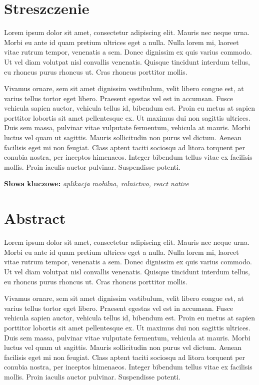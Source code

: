 \documentclass[a4paper,12pt,oneside]{book}
\begin{document}
	\thispagestyle{empty}
	
	
	\newpage
	\thispagestyle{empty}
	\chapter*{Streszczenie}
		Lorem ipsum dolor sit amet, consectetur adipiscing elit. Mauris nec neque urna. Morbi eu ante id quam pretium ultrices eget a nulla. Nulla lorem mi, laoreet vitae rutrum tempor, venenatis a sem. Donec dignissim ex quis varius commodo. Ut vel diam volutpat nisl convallis venenatis. Quisque tincidunt interdum tellus, eu rhoncus purus rhoncus ut. Cras rhoncus porttitor mollis.
	
		Vivamus ornare, sem sit amet dignissim vestibulum, velit libero congue est, at varius tellus tortor eget libero. Praesent egestas vel est in accumsan. Fusce vehicula sapien auctor, vehicula tellus id, bibendum est. Proin eu metus at sapien porttitor lobortis sit amet pellentesque ex. Ut maximus dui non sagittis ultrices. Duis sem massa, pulvinar vitae vulputate fermentum, vehicula at mauris. Morbi luctus vel quam ut sagittis. Mauris sollicitudin non purus vel dictum. Aenean facilisis eget mi non feugiat. Class aptent taciti sociosqu ad litora torquent per conubia nostra, per inceptos himenaeos. Integer bibendum tellus vitae ex facilisis mollis. Proin iaculis auctor pulvinar. Suspendisse potenti.
			
		\textbf{Słowa kluczowe:} \textit{aplikacja mobilna, rolnictwo, react native}
	
		\newpage
	\thispagestyle{empty}
	\chapter*{Abstract}
		Lorem ipsum dolor sit amet, consectetur adipiscing elit. Mauris nec neque urna. Morbi eu ante id quam pretium ultrices eget a nulla. Nulla lorem mi, laoreet vitae rutrum tempor, venenatis a sem. Donec dignissim ex quis varius commodo. Ut vel diam volutpat nisl convallis venenatis. Quisque tincidunt interdum tellus, eu rhoncus purus rhoncus ut. Cras rhoncus porttitor mollis.
	
		Vivamus ornare, sem sit amet dignissim vestibulum, velit libero congue est, at varius tellus tortor eget libero. Praesent egestas vel est in accumsan. Fusce vehicula sapien auctor, vehicula tellus id, bibendum est. Proin eu metus at sapien porttitor lobortis sit amet pellentesque ex. Ut maximus dui non sagittis ultrices. Duis sem massa, pulvinar vitae vulputate fermentum, vehicula at mauris. Morbi luctus vel quam ut sagittis. Mauris sollicitudin non purus vel dictum. Aenean facilisis eget mi non feugiat. Class aptent taciti sociosqu ad litora torquent per conubia nostra, per inceptos himenaeos. Integer bibendum tellus vitae ex facilisis mollis. Proin iaculis auctor pulvinar. Suspendisse potenti.
		
\end{document}
